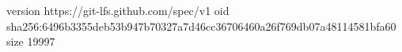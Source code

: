 version https://git-lfs.github.com/spec/v1
oid sha256:6496b3355deb53b947b70327a7d46cc36706460a26f769db07a48114581bfa60
size 19997
